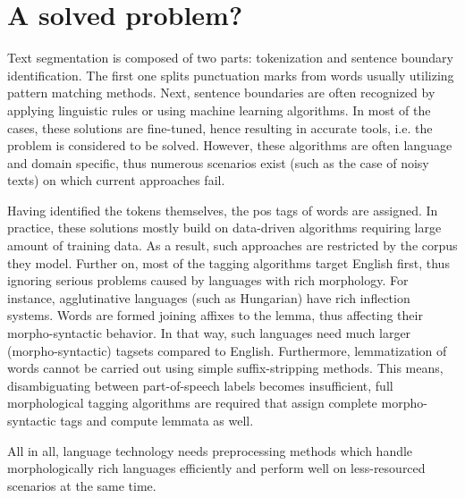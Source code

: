 \section{A solved problem?}



Text segmentation is composed of two parts: tokenization and sentence boundary identification. 
The first one splits punctuation marks from words usually utilizing  pattern matching methods.
Next, sentence boundaries are often recognized by applying linguistic rules or using machine learning algorithms.
In most of the cases, these solutions are fine-tuned, hence resulting in accurate tools, i.e. the problem is considered to be solved.
However, these algorithms are often language and domain specific, thus numerous scenarios exist (such as the case of noisy texts) on which current approaches fail.

Having identified the tokens themselves, the \gls{pos} tags of words are assigned.
In practice, these solutions mostly build on data-driven algorithms requiring large amount of training data.
As a result, such approaches are restricted by the corpus they model.
Further on, most of the tagging algorithms target English first, thus ignoring serious problems caused by languages with rich morphology.
For instance, agglutinative languages (such as Hungarian) have rich inflection systems.
Words are formed joining affixes to the lemma, thus affecting their morpho-syntactic behavior.
In that way, such languages need much larger (morpho-syntactic) tagsets compared to English. 
Furthermore, lemmatization of words cannot be carried out using simple suffix-stripping methods.
This means, disambiguating between part-of-speech labels becomes insufficient, full morphological tagging algorithms are required that assign complete morpho-syntactic tags and compute lemmata as well.

All in all, language technology needs preprocessing methods which handle morphologically rich languages efficiently 
and perform well on less-resourced scenarios at the same time.

